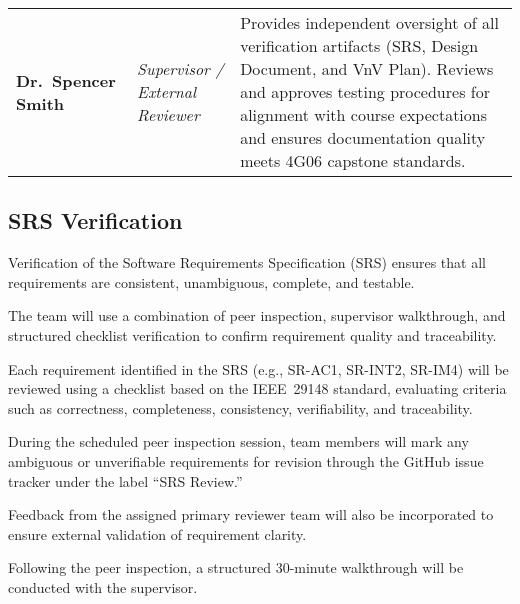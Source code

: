 \documentclass[12pt, titlepage]{article}
\begin{document}
\begin{center}
\begin{longtable}{|>{\raggedright\arraybackslash}p{}|
                    >{\raggedright\arraybackslash}p{}|
                    >{\raggedright\arraybackslash}p{}|}
\textbf{Dr.\ Spencer Smith} &
\textit{Supervisor / External Reviewer} &
Provides independent oversight of all verification artifacts (SRS, Design Document, and VnV Plan). Reviews and approves testing procedures for alignment with course expectations and ensures documentation quality meets 4G06 capstone standards. \\
\end{longtable}
\end{center}



\subsection{SRS Verification}
\label{subsec:srs-verification}


Verification of the Software Requirements Specification (SRS) ensures that all
requirements are consistent, unambiguous, complete, and testable.

The team will use a combination of peer inspection, supervisor walkthrough, and
structured checklist verification to confirm requirement quality and
traceability.

Each requirement identified in the SRS (e.g., SR-AC1, SR-INT2, SR-IM4) will be
reviewed using a checklist based on the IEEE~29148 standard, evaluating criteria
such as correctness, completeness, consistency, verifiability, and
traceability.

During the scheduled peer inspection session, team members will mark any
ambiguous or unverifiable requirements for revision through the GitHub issue
tracker under the label ``SRS Review.''

Feedback from the assigned primary reviewer team will also be incorporated to
ensure external validation of requirement clarity.

Following the peer inspection, a structured 30-minute walkthrough will be
conducted with the supervisor.
\end{document}
